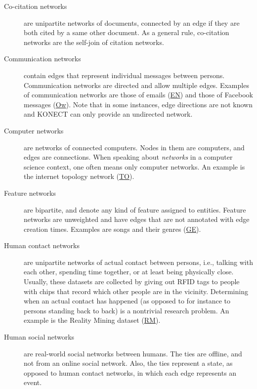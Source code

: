 \documentclass{article}
\begin{document}
\begin{description}
\item[Co-citation networks] are unipartite networks of documents,
  connected by an edge if they are both cited by a same other document.
  As a general rule, co-citation networks are the self-join of citation
  networks. 
  
\item[Communication networks] contain edges that represent
  individual messages between persons.  Communication networks are directed
  and allow multiple edges.  
  Examples of communication networks are those of
  emails (\href{http://konect.cc/networks/enron/}{\textsf{EN}})
  and those of
  Facebook messages
  (\href{http://konect.cc/networks/facebook-wosn-wall/}{\textsf{Ow}}). Note
  that in some instances, edge directions are not 
  known and KONECT can only provide an undirected network. 

\item[Computer networks] are networks of connected computers. 
  Nodes in them are computers, and edges are connections. 
  When speaking about \emph{networks} in a computer science context, one
  often means only computer networks.  An example is the internet
  topology network (\href{http://konect.cc/networks/topology/}{\textsf{TO}}).

\item[Feature networks] are bipartite, and denote any kind of feature
  assigned to entities. Feature networks are unweighted and have
  edges that are not annotated with edge creation times.  Examples are
  songs and their genres
  (\href{http://konect.cc/networks/dbpedia-genre/}{\textsf{GE}}).   

\item[Human contact networks] are unipartite networks of actual contact
  between persons, i.e., talking with each other, spending time
  together, or at least being physically close.  Usually, these datasets
  are collected by giving out RFID tags to people with chips that record
  which other people are in the vicinity.  Determining when an actual
  contact has happened (as opposed to for instance to persons standing
  back to back) is a nontrivial research problem. 
  An example is the Reality Mining dataset
  (\href{http://konect.cc/networks/mit/}{\textsf{RM}}). 

\item[Human social networks] are real-world social networks between
  humans.   The ties are offline,
  and not from an online social network.  Also, the ties represent a
  state, as opposed to human contact networks, in which each edge
  represents an event.


\end{description}
\end{document}
